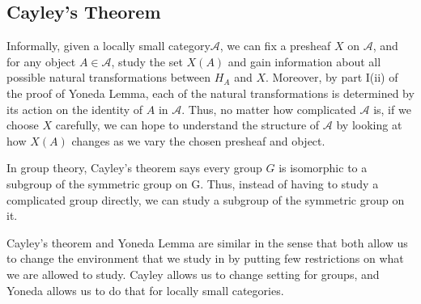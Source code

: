 \documentclass[a4paper]{article}
\theoremstyle{definition}
\begin{document}
		\subsection{Cayley's Theorem}%
		Informally, given a locally small category$\mathcal{A} $, we can fix a presheaf $X$ on $\mathcal{A}$,
		and for any object $A \in \mathcal{A} $, study the set $X(A)$ and gain information
		about all possible natural transformations between $H_A$ and $X$. Moreover, by part I(ii) of the
		proof of Yoneda Lemma, each of the natural transformations is determined by its action
		on the identity of $A$ in $\mathcal{A}$. Thus, no matter how complicated $\mathcal{A}$ is, if we choose $X$ carefully, we can hope to understand the structure of $\mathcal{A} $
		by looking at how $X(A)$ changes as we vary the chosen
		presheaf and object.

		In group theory, Cayley's theorem says every group $G$ is isomorphic to a subgroup of the symmetric
		group on G. Thus, instead of having to study a complicated group directly, we can study a subgroup of
		the symmetric group on it.

		Cayley's theorem and Yoneda Lemma are similar in the sense that both allow us to change the environment
		that we study in by putting few restrictions on what we are allowed to study. Cayley allows us to
		change setting for groups, and Yoneda allows us to do that for locally small categories.
\end{document}
